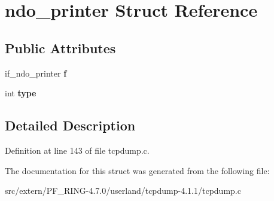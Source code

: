 \hypertarget{structndo__printer}{
\section{ndo\_\-printer Struct Reference}
\label{structndo__printer}
}
\subsection*{Public Attributes}
\begin{DoxyCompactItemize}
\item 
\hypertarget{structndo__printer_aaef1ed9e1d9f9f70030bc7d683b14897}{
if\_\-ndo\_\-printer {\bfseries f}}
\label{structndo__printer_aaef1ed9e1d9f9f70030bc7d683b14897}

\item 
\hypertarget{structndo__printer_ac4ad48c15b14c30781c6b6409afca358}{
int {\bfseries type}}
\label{structndo__printer_ac4ad48c15b14c30781c6b6409afca358}

\end{DoxyCompactItemize}


\subsection{Detailed Description}


Definition at line 143 of file tcpdump.c.



The documentation for this struct was generated from the following file:\begin{DoxyCompactItemize}
\item 
src/extern/PF\_\-RING-\/4.7.0/userland/tcpdump-\/4.1.1/tcpdump.c\end{DoxyCompactItemize}
